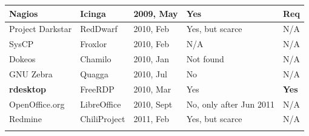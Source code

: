 \documentclass[ifip]{svmult}
\begin{document}
\begin{table}
\begin{tabular}{p{0.95in} p{0.85in} p{0.7in} p{1.4in} p{0.4in}}
Nagios & Icinga & 2009, May & Yes & Req \\ \hline
Project Darkstar& RedDwarf & 2010, Feb & Yes, but scarce & N/A \\ \hline
SysCP & Froxlor & 2010, Feb & N/A & N/A \\ \hline
Dokeos & Chamilo & 2010, Jan & Not found & N/A \\ \hline
GNU Zebra & Quagga & 2010, Jul & No & N/A \\ \hline
\textbf{rdesktop} & FreeRDP & 2010, Mar & Yes & \textbf{Yes} \\ \hline
OpenOffice.org & LibreOffice & 2010, Sept & No, only after Jun 2011 & N/A \\ \hline
Redmine & ChiliProject & 2011, Feb & Yes, but scarce & N/A \\
\noalign{\smallskip}\hline
\end{tabular}
\end{table}



% 
% 
%

%
%
\end{document}
